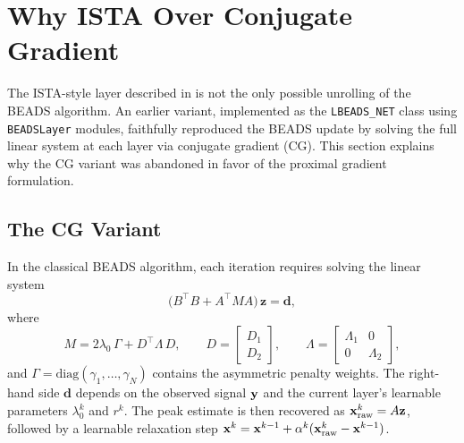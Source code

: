 \section{Why ISTA Over Conjugate Gradient}
\label{sec:method_ista}

The ISTA-style layer described in  is not the only possible unrolling of the BEADS algorithm. An earlier variant, implemented as the \texttt{LBEADS\_NET} class using \texttt{BEADSLayer} modules, faithfully reproduced the BEADS update by solving the full linear system at each layer via conjugate gradient (CG). This section explains why the CG variant was abandoned in favor of the proximal gradient formulation.


\subsection{The CG Variant}
\label{sec:method_cg_variant}

In the classical BEADS algorithm, each iteration requires solving the linear system
\begin{equation}
    \big(B^\top B + A^\top M A\big)\, \mathbf{z} = \mathbf{d},
    \label{eq:linear_system}
\end{equation}
where
\begin{equation}
    M = 2\lambda_0 \,\Gamma + D^\top \Lambda\, D, \qquad
    D = \begin{bmatrix} D_1 \\ D_2 \end{bmatrix}, \qquad
    \Lambda = \begin{bmatrix} \Lambda_1 & 0 \\ 0 & \Lambda_2 \end{bmatrix},
\end{equation}
and $\Gamma = \text{diag}(\gamma_1, \ldots, \gamma_N)$ contains the asymmetric penalty weights. The right-hand side $\mathbf{d}$ depends on the observed signal $\mathbf{y}$ and the current layer's learnable parameters $\lambda_0^k$ and $r^k$. The peak estimate is then recovered as $\mathbf{x}^k_{\text{raw}} = A\mathbf{z}$, followed by a learnable relaxation step $\mathbf{x}^k = \mathbf{x}^{k-1} + \alpha^k(\mathbf{x}^k_{\text{raw}} - \mathbf{x}^{k-1})$.

